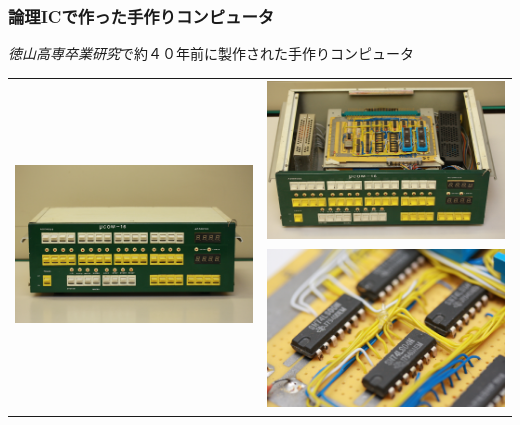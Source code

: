 \documentclass[handout]{beamer}        %
\begin{document}
\begin{frame}
  \frametitle{論理ICで作った手作りコンピュータ}
  \emph{徳山高専卒業研究}で約４０年前に製作された手作りコンピュータ
  \vfill
  \begin{tabular}{c c}
  \multirow{2}{*}{\includegraphics[scale=0.04]{../Img/uCom16_1.jpg}}
  &\includegraphics[scale=0.03]{../Img/uCom16_2.jpg} \\
  &\includegraphics[scale=0.03]{../Img/uCom16_3.jpg}
  \end{tabular}
\end{frame}
\end{document}
